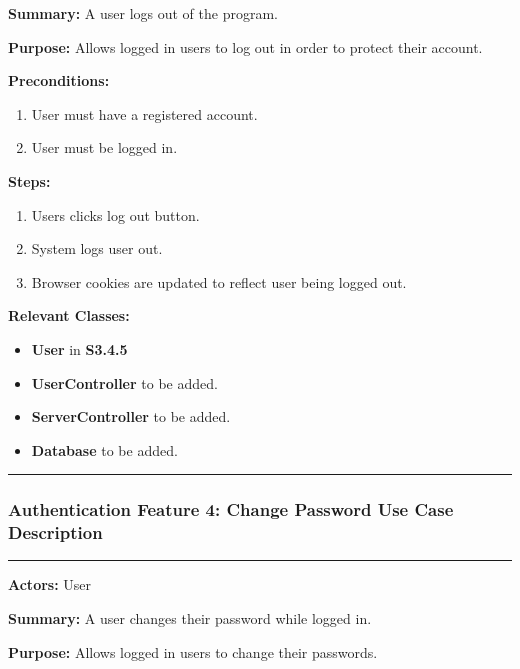 \documentclass[twoside,letterpaper]{article}
\begin{document}
	\noindent\textbf{Summary:} A user logs out of the program.  \newline
	
	\noindent\textbf{Purpose:} Allows logged in users to log out in order to protect their account.  \newline
	
	\noindent\textbf{Preconditions:}
	\begin{enumerate}
		\item User must have a registered account.
		\item User must be logged in.
	\end{enumerate}
	
	\noindent\textbf{Steps:}
	\begin{enumerate}
		\item Users clicks log out button.
		\item System logs user out.
		\item Browser cookies are updated to reflect user being logged out.
	\end{enumerate}
	
	\noindent\textbf{Relevant Classes:}
	\begin{itemize}
		\item \textbf{User} in \textbf{S3.4.5}
		\item \textbf{UserController} to be added.
		\item \textbf{ServerController} to be added.
		\item \textbf{Database} to be added.
	\end{itemize}
	\vspace{8pt}
	\hrule
	\newpage
	
	\subsubsection[Authentication Feature 4: Change Password Use Case Description]{\rmfamily\bfseries\color{black}
		Authentication Feature 4: Change Password Use Case Description}
		\label{a:uc4}
	\hypertarget{RefHeading22059017292}{}
	
	\hrule
	\vspace{8pt}
	\noindent\textbf{Actors:} User \newline
	
	\noindent\textbf{Summary:} A user changes their password while logged in.  \newline
	
	\noindent\textbf{Purpose:} Allows logged in users to change their passwords.  \newline
	
\end{document}
